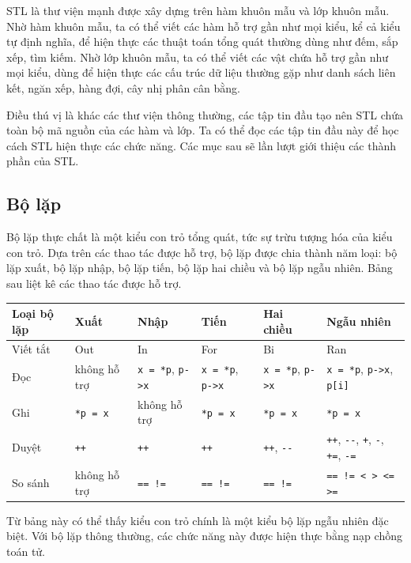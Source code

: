 \documentclass[11pt]{article}
\begin{document}
STL là thư viện mạnh được xây dựng trên hàm khuôn mẫu và lớp khuôn mẫu. Nhờ
hàm khuôn mẫu, ta có thể viết các hàm hỗ trợ gần như mọi kiểu, kể cả kiểu tự
định nghĩa, để hiện thực các thuật toán tổng quát thường dùng như đếm, sắp
xếp, tìm kiếm. Nhờ lớp khuôn mẫu, ta có thể viết các vật chứa hỗ trợ gần như
mọi kiểu, dùng để hiện thực các cấu trúc dữ liệu thường gặp như danh sách
liên kết, ngăn xếp, hàng đợi, cây nhị phân cân bằng.

Điều thú vị là khác các thư viện thông thường, các tập tin đầu tạo nên STL
chứa toàn bộ mã nguồn của các hàm và lớp. Ta có thể đọc các tập tin đầu này
để học cách STL hiện thực các chức năng. Các mục sau sẽ lần lượt giới thiệu
các thành phần của STL.

\subsection{Bộ lặp}

Bộ lặp thực chất là một kiểu con trỏ tổng quát, tức sự trừu tượng hóa của
kiểu con trỏ. Dựa trên các thao tác được hỗ trợ, bộ lặp được chia thành năm
loại: bộ lặp xuất, bộ lặp nhập, bộ lặp tiến, bộ lặp hai chiều và bộ lặp ngẫu
nhiên. Bảng sau liệt kê các thao tác được hỗ trợ.

\begin{center}
\scriptsize
\begin{tabular}{llllll}
\hline
\textbf{Loại bộ lặp} & \textbf{Xuất} & \textbf{Nhập} & \textbf{Tiến} &
\textbf{Hai chiều} & \textbf{Ngẫu nhiên}\\
\hline
Viết tắt & Out & In & For & Bi & Ran\\
Đọc & không hỗ trợ & \verb|x = *p|, \verb|p->x| &
\verb|x = *p|, \verb|p->x| & \verb|x = *p|, \verb|p->x| &
\verb|x = *p|, \verb|p->x|, \verb|p[i]|\\
Ghi & \verb|*p = x| & không hỗ trợ & \verb|*p = x| &
\verb|*p = x| & \verb|*p = x|\\
Duyệt & \verb|++| & \verb|++| & \verb|++| & \verb|++|, \verb|--| &
\verb|++|, \verb|--|, \verb|+|, \verb|-|, \verb|+=|, \verb|-=|\\
So sánh & không hỗ trợ & \verb|== !=| & \verb|== !=| & \verb|== !=| &
\verb|== != < > <= >=|\\
\hline
\end{tabular}
\end{center}

Từ bảng này có thể thấy kiểu con trỏ chính là một kiểu bộ lặp ngẫu nhiên đặc
biệt. Với bộ lặp thông thường, các chức năng này được hiện thực bằng nạp
chồng toán tử.
\end{document}
